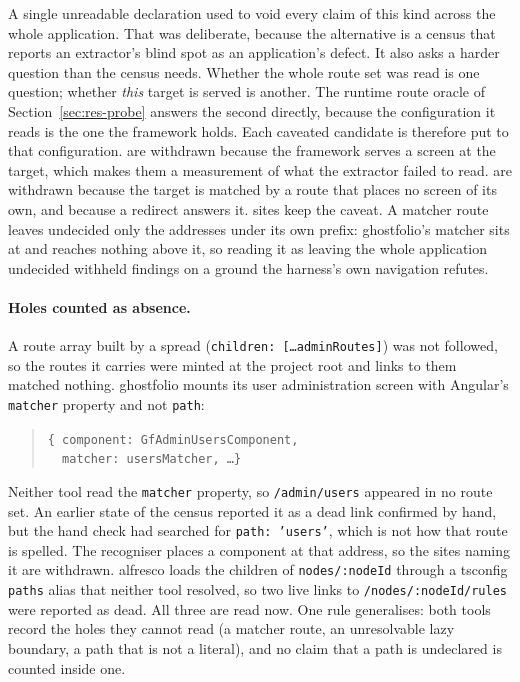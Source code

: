 A single unreadable declaration used to void every claim of this kind across the whole application. That was deliberate, because the alternative is a census that reports an extractor's blind spot as an application's defect. It also asks a harder question than the census needs. Whether the whole route set was read is one question; whether \emph{this} target is served is another. The runtime route oracle of Section~\ref{sec:res-probe} answers the second directly, because the configuration it reads is the one the framework holds. Each caveated candidate is therefore put to that configuration. \RoundTwoFrameworkMountsIt{} are withdrawn because the framework serves a screen at the target, which makes them a measurement of what the extractor failed to read. \RoundTwoFrameworkPrefix{} are withdrawn because the target is matched by a route that places no screen of its own, and \RoundTwoFrameworkRedirects{} because a redirect answers it. \RoundTwoWildcardCaveated{} sites keep the caveat. A matcher route leaves undecided only the addresses under its own prefix: ghostfolio's matcher sits at  and reaches nothing above it, so reading it as leaving the whole application undecided withheld findings on a ground the harness's own navigation refutes.

\paragraph{Holes counted as absence.} A route array built by a spread (\texttt{children: [\ldots adminRoutes]}) was not followed, so the routes it carries were minted at the project root and links to them matched nothing. ghostfolio mounts its user administration screen with Angular's \texttt{matcher} property and not \texttt{path}:

\begin{quote}
\texttt{\{ component: GfAdminUsersComponent,}\\
\texttt{\ \ matcher: usersMatcher, \ldots \}}
\end{quote}

\noindent Neither tool read the \texttt{matcher} property, so \texttt{/admin/users} appeared in no route set. An earlier state of the census reported it as a dead link confirmed by hand, but the hand check had searched for \texttt{path: 'users'}, which is not how that route is spelled. The recogniser places a component at that address, so the sites naming it are withdrawn. alfresco loads the children of \texttt{nodes/:nodeId} through a tsconfig \texttt{paths} alias that neither tool resolved, so two live links to \texttt{/nodes/:nodeId/rules} were reported as dead. All three are read now. One rule generalises: both tools record the holes they cannot read (a matcher route, an unresolvable lazy boundary, a path that is not a literal), and no claim that a path is undeclared is counted inside one.


